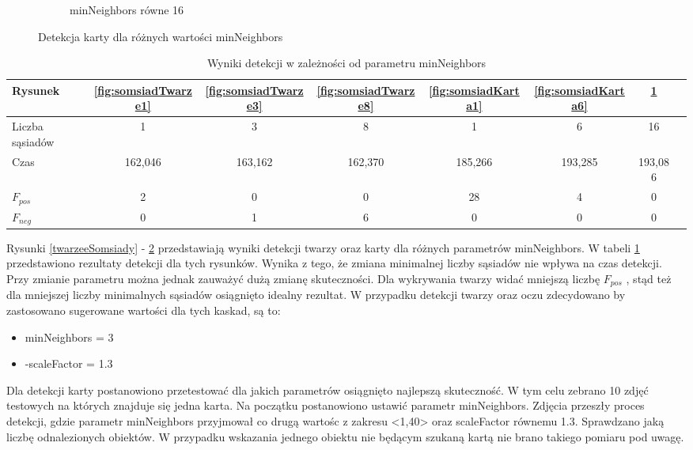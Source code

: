\begin{figure}[H]
\begin{subfigure}{0.32\textwidth}
        \caption{minNeighbors równe 16}
        \label{fig:somsiadKarta16}
    \end{subfigure}
    \caption{Detekcja karty dla różnych wartości minNeighbors}
    \label{kartySomsiady}
\end{figure}


\begin{table}[H]
    \caption{Wyniki detekcji w zależności od parametru minNeighbors}
    \label{tab:somsiady}
    \begin{tabular}{|l|c|c|c|c|c|c|c|}
\hline
Rysunek & \ref{fig:somsiadTwarze1} & \ref{fig:somsiadTwarze3} & \ref{fig:somsiadTwarze8} & \ref{fig:somsiadKarta1} & \ref{fig:somsiadKarta6} & \ref{fig:somsiadKarta16}\\
\hline
Liczba sąsiadów & 1 & 3 & 8 & 1 & 6 & 16\\
\hline
Czas & 162,046 & 163,162 & 162,370 & 185,266 & 193,285 & 193,086\\
\hline
$F_{pos}$ & 2 & 0 & 0 & 28 & 4 & 0\\
\hline
$F_{neg}$ & 0 & 1 & 6 & 0 & 0 & 0\\
\hline
\end{tabular}
\end{table}

Rysunki \ref{twarzeeSomsiady} - \ref{kartySomsiady} przedstawiają wyniki detekcji twarzy oraz karty dla różnych parametrów minNeighbors. W tabeli \ref{tab:somsiady} przedstawiono rezultaty detekcji dla tych rysunków. Wynika z tego, że zmiana minimalnej liczby sąsiadów nie wpływa na czas detekcji. Przy zmianie parametru można jednak zauważyć dużą zmianę skuteczności. Dla wykrywania twarzy widać mniejszą liczbę ${F_{pos}}$ , stąd też dla mniejszej liczby minimalnych sąsiadów osiągnięto idealny rezultat.
W przypadku detekcji twarzy oraz oczu zdecydowano by zastosowano sugerowane wartości dla tych kaskad, są to:
\begin{itemize}
    \item minNeighbors = 3
    \item -scaleFactor = 1.3
\end{itemize}

Dla detekcji karty postanowiono przetestować dla jakich parametrów osiągnięto najlepszą skuteczność. W tym celu zebrano 10 zdjęć testowych na których znajduje się jedna karta. Na początku postanowiono ustawić parametr minNeighbors.
Zdjęcia przeszły proces detekcji, gdzie parametr minNeighbors przyjmował co drugą wartośc z zakresu <1,40> oraz scaleFactor równemu 1.3. Sprawdzano jaką liczbę odnalezionych obiektów. W przypadku wskazania jednego obiektu nie będącym szukaną kartą nie brano takiego pomiaru pod uwagę.

